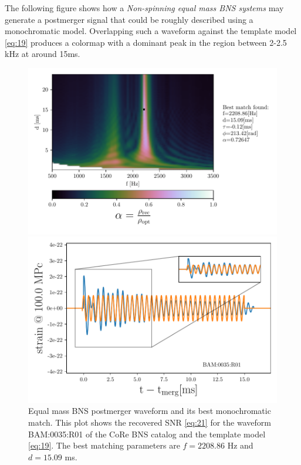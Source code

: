 The following figure shows how a \textit{Non-spinning equal mass BNS systems} may generate a postmerger signal that could be roughly described using a monochromatic model. Overlapping such a waveform against the template model \ref{eq:19} produces a colormap with a dominant peak in the region between 2-2.5 kHz at around 15ms. 

\begin{figure}[!htbp]
\begin{center}
\begin{minipage}[t]{0.5\linewidth}
\vspace{0pt}
\includegraphics[scale=0.6,trim={2mm 0 35mm 0},clip]{images/Data_analysis/results/2D_grid_1.pdf}
\end{minipage}%
\begin{minipage}[t]{0.5\linewidth}
\vspace{20pt}
\includegraphics[scale=0.45]{images/Data_analysis/results/2D_grid_2.pdf}
\end{minipage}
\captionsetup{width=0.8\textwidth}
\caption[Equal mass BNS system's postmerger waveform and its best monochromatic match]{Equal mass BNS postmerger waveform and its best monochromatic match. This plot shows the recovered SNR \ref{eq:21} for the waveform BAM:0035:R01 of the CoRe BNS catalog \cite{Dietrich:2018phi} and the template model \ref{eq:19}. The best matching parameters are $f=2208.86$ Hz and $d=15.09$ ms.}
\label{eqmass}
\end{center}
\end{figure}

